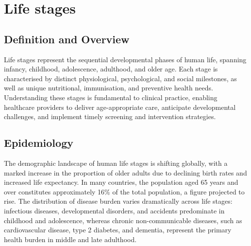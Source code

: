 \chapter{Life stages}

\section*{Definition and Overview}
Life stages represent the sequential developmental phases of human life, spanning infancy, childhood, adolescence, adulthood, and older age. Each stage is characterised by distinct physiological, psychological, and social milestones, as well as unique nutritional, immunisation, and preventive health needs. Understanding these stages is fundamental to clinical practice, enabling healthcare providers to deliver age-appropriate care, anticipate developmental challenges, and implement timely screening and intervention strategies.

\section*{Epidemiology}
The demographic landscape of human life stages is shifting globally, with a marked increase in the proportion of older adults due to declining birth rates and increased life expectancy. In many countries, the population aged 65 years and over constitutes approximately 16\% of the total population, a figure projected to rise. The distribution of disease burden varies dramatically across life stages: infectious diseases, developmental disorders, and accidents predominate in childhood and adolescence, whereas chronic non-communicable diseases, such as cardiovascular disease, type 2 diabetes, and dementia, represent the primary health burden in middle and late adulthood.

